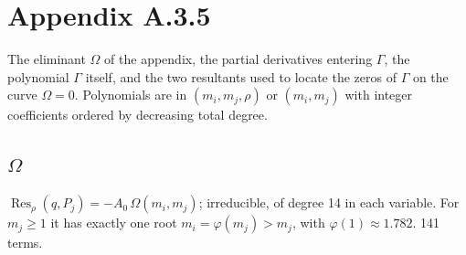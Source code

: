 \section*{Appendix A.3.5}
The eliminant $\Omega$ of the appendix, the partial derivatives entering $\Gamma$, the polynomial $\Gamma$ itself, and the two resultants used to locate the zeros of $\Gamma$ on the curve $\Omega=0$. Polynomials are in $(m_i,m_j,\rho)$ or $(m_i,m_j)$ with integer coefficients ordered by decreasing total degree.

\subsection*{$\Omega$}
$\operatorname{Res}_\rho(q,P_j)=-A_0\,\Omega(m_i,m_j)$; irreducible, of degree 14 in each variable. For $m_j\ge1$ it has exactly one root $m_i=\varphi(m_j)>m_j$, with $\varphi(1)\approx1.782$. 141 terms.
